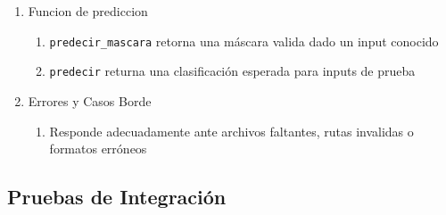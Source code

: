 \begin{enumerate}
\begin{enumerate}
    \item Funcion de prediccion
    \begin{enumerate}
        \item \texttt{predecir\_mascara} retorna una máscara  valida dado un input conocido
        \item \texttt{predecir} returna una clasificación esperada para inputs de prueba
    \end{enumerate}
\item Errores y Casos Borde
\begin{enumerate}
    \item Responde adecuadamente ante archivos faltantes, rutas invalidas o formatos erróneos
\end{enumerate}
\end{enumerate}
\end{enumerate}

\subsection{Pruebas de Integración}
\label{ssc:IT}

